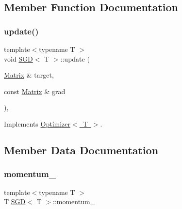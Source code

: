 \subsection{Member Function Documentation}
\mbox{\label{class_s_g_d_a0345cfa977a251c576096ea6a098230f}} 
\subsubsection{\texorpdfstring{update()}{update()}}
{\footnotesize\ttfamily template$<$typename T $>$ \\
void \mbox{\hyperlink{class_s_g_d}{S\+GD}}$<$ T $>$\+::update (\begin{DoxyParamCaption}\item[{\mbox{\hyperlink{class_s_g_d_a0c157dbad2dc900c00b9ca57f23ba676}{Matrix}} \&}]{target,  }\item[{const \mbox{\hyperlink{class_s_g_d_a0c157dbad2dc900c00b9ca57f23ba676}{Matrix}} \&}]{grad }\end{DoxyParamCaption})\hspace{0.3cm}{\ttfamily [override]}, {\ttfamily [virtual]}}



Implements \mbox{\hyperlink{class_optimizer_a3f4859896cf9edab31b3875af7aad0cd}{Optimizer$<$ T $>$}}.



\subsection{Member Data Documentation}
\mbox{\label{class_s_g_d_abc4dc58d224e921bc278508f5edfe1bd}} 
\subsubsection{\texorpdfstring{momentum\_}{momentum\_}}
{\footnotesize\ttfamily template$<$typename T $>$ \\
T \mbox{\hyperlink{class_s_g_d}{S\+GD}}$<$ T $>$\+::momentum\+\_\+\hspace{0.3cm}{\ttfamily [protected]}}

\mbox{\label{class_s_g_d_ae34e45e15ff22ca62ee0d61104da2ff7}} 
